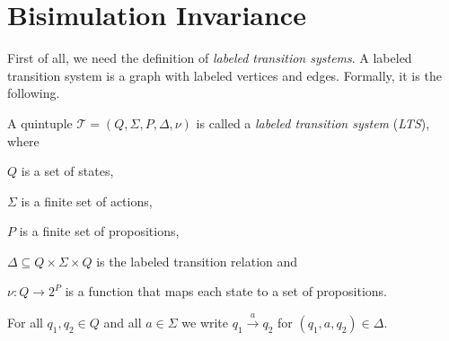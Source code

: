
\section{Bisimulation Invariance}\label{sec:bisimulationInvariance}

First of all, we need the definition of \textit{labeled transition systems}. A labeled transition system is a graph
with labeled vertices and edges. Formally, it is the following.

\begin{definition}
    \label{definition:lts}
    A quintuple $\mathcal{T} = (Q, \Sigma, P, \Delta, \nu)$ is called a \emph{labeled transition system} (\emph{LTS}),
    where
    \begin{compactitem}
        \item $Q$ is a set of states,
        \item $\Sigma$ is a finite set of actions,
        \item $P$ is a finite set of propositions,
        \item $\Delta \subseteq Q \times \Sigma \times Q$ is the labeled transition relation and
        \item $\nu: Q \rightarrow 2^P$ is a function that maps each state to a set of propositions.
    \end{compactitem}
\end{definition}

For all $q_1, q_2 \in Q$ and all $a \in \Sigma$ we write $q_1 \overset{a}{\rightarrow} q_2$ for $(q_1, a, q_2) \in
\Delta$.

